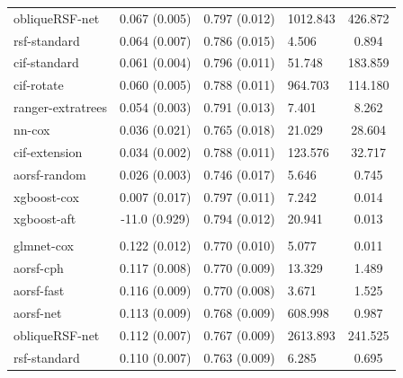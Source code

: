 \documentclass[twoside,11pt]{article}\usepackage[]{graphicx}\usepackage[]{xcolor}
\newenvironment{knitrout}{}{} %
\begin{document}
\begin{knitrout}
\begin{longtable}[t]{lcclc}
\hspace{1em}obliqueRSF-net & 0.067 (0.005) & 0.797 (0.012) & 1012.843 & 426.872\\
\hspace{1em}rsf-standard & 0.064 (0.007) & 0.786 (0.015) & 4.506 & 0.894\\
\hspace{1em}cif-standard & 0.061 (0.004) & 0.796 (0.011) & 51.748 & 183.859\\
\hspace{1em}cif-rotate & 0.060 (0.005) & 0.788 (0.011) & 964.703 & 114.180\\
\hspace{1em}ranger-extratrees & 0.054 (0.003) & 0.791 (0.013) & 7.401 & 8.262\\
\hspace{1em}nn-cox & 0.036 (0.021) & 0.765 (0.018) & 21.029 & 28.604\\
\hspace{1em}cif-extension & 0.034 (0.002) & 0.788 (0.011) & 123.576 & 32.717\\
\hspace{1em}aorsf-random & 0.026 (0.003) & 0.746 (0.017) & 5.646 & 0.745\\
\hspace{1em}xgboost-cox & 0.007 (0.017) & 0.797 (0.011) & 7.242 & 0.014\\
\hspace{1em}xgboost-aft & -11.0 (0.929) & 0.794 (0.012) & 20.941 & 0.013\\
\addlinespace[0.3em]
\hline
\multicolumn{5}{l}{\textit{\textbf{SPRINT; death, n = 9361, p = 174}}}\\
\hline
\hspace{1em}glmnet-cox & 0.122 (0.012) & 0.770 (0.010) & 5.077 & 0.011\\
\hspace{1em}aorsf-cph & 0.117 (0.008) & 0.770 (0.009) & 13.329 & 1.489\\
\hspace{1em}aorsf-fast & 0.116 (0.009) & 0.770 (0.008) & 3.671 & 1.525\\
\hspace{1em}aorsf-net & 0.113 (0.009) & 0.768 (0.009) & 608.998 & 0.987\\
\hspace{1em}obliqueRSF-net & 0.112 (0.007) & 0.767 (0.009) & 2613.893 & 241.525\\
\hspace{1em}rsf-standard & 0.110 (0.007) & 0.763 (0.009) & 6.285 & 0.695\\

\end{longtable}
\end{knitrout}
\end{document}
